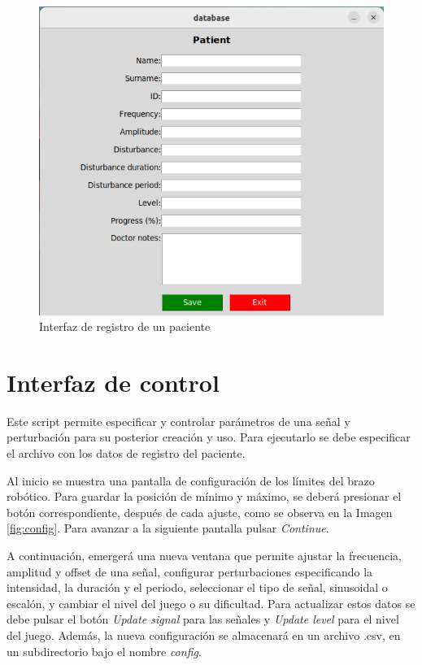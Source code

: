 \begin{figure}[ht!]
	\centering
	\begin{minipage}{0.75\linewidth}
		\centering
		\includegraphics[width=\linewidth]{figs/registro.png}
	\end{minipage}
	\caption[Interfaz de registro de un paciente]{Interfaz de registro de un paciente}
	\label{fig:database}
\end{figure}

\section{Interfaz de control}

Este script permite especificar y controlar parámetros de una señal y perturbación para su posterior creación y uso.
Para ejecutarlo se debe especificar el archivo con los datos de registro del paciente.

Al inicio se muestra una pantalla de configuración de los límites del brazo robótico.
Para guardar la posición de mínimo y máximo, se deberá presionar el botón correspondiente, después de cada ajuste, como se observa en la Imagen \ref{fig:config}.
Para avanzar a la siguiente pantalla pulsar \textit{Continue}.

A continuación, emergerá una nueva ventana que permite ajustar la frecuencia, amplitud y offset de una señal, configurar perturbaciones especificando la intensidad, la duración y el periodo, seleccionar el tipo de señal, sinusoidal o escalón, y cambiar el nivel del juego o su dificultad.
Para actualizar estos datos se debe pulsar el botón \textit{Update signal} para las señales y \textit{Update level} para el nivel del juego.
Además, la nueva configuración se almacenará en un archivo .csv, en un subdirectorio bajo el nombre \textit{config}.

